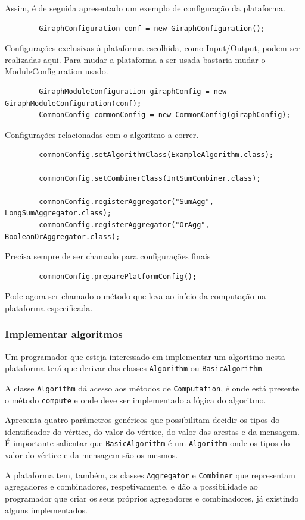 Assim, é de seguida apresentado um exemplo de configuração da plataforma.

\begin{verbatim}
		GiraphConfiguration conf = new GiraphConfiguration();
\end{verbatim}
		Configurações exclusivas à plataforma escolhida, como Input/Output, podem ser realizadas aqui.
		\newline
		Para mudar a plataforma a ser usada bastaria mudar o ModuleConfiguration usado.
	\begin{verbatim}
		GiraphModuleConfiguration giraphConfig = new GiraphModuleConfiguration(conf);
		CommonConfig commonConfig = new CommonConfig(giraphConfig);
	\end{verbatim}	
		
Configurações relacionadas com o algoritmo a correr.
\begin{verbatim}			
		commonConfig.setAlgorithmClass(ExampleAlgorithm.class);
		
		commonConfig.setCombinerClass(IntSumCombiner.class);
		
		commonConfig.registerAggregator("SumAgg", LongSumAggregator.class);
		commonConfig.registerAggregator("OrAgg", BooleanOrAggregator.class);
\end{verbatim}		
Precisa sempre de ser chamado para configurações finais
\begin{verbatim}
		commonConfig.preparePlatformConfig();
\end{verbatim}
Pode agora ser chamado o método que leva ao início da computação na plataforma especificada.

\subsubsection*{Implementar algoritmos}
Um programador que esteja interessado em implementar um algoritmo nesta plataforma terá que derivar das classes \texttt{Algorithm} ou \texttt{BasicAlgorithm}.

A classe \texttt{Algorithm} dá acesso aos métodos de \texttt{Computation}, é onde está presente o método \texttt{compute} e onde deve ser implementado a lógica do algoritmo.

Apresenta quatro parâmetros genéricos que possibilitam decidir os tipos do identificador do vértice, do valor do vértice, do valor das arestas e da mensagem. É importante salientar que \texttt{BasicAlgorithm} é um \texttt{Algorithm} onde os tipos do valor do vértice e da mensagem são os mesmos.

A plataforma tem, também, as classes \texttt{Aggregator} e \texttt{Combiner} que representam agregadores e combinadores, respetivamente, e dão a possibilidade ao programador que criar os seus próprios agregadores e combinadores, já existindo alguns implementados.


